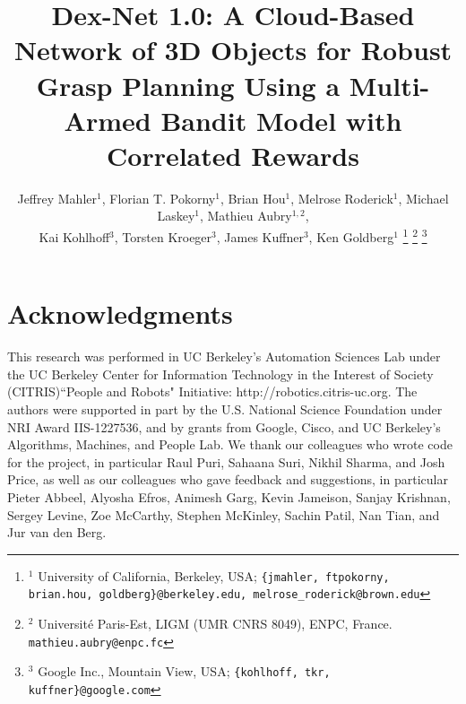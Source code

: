 \documentclass[letterpaper, 10 pt, conference]{ieeeconf}  %
\begin{document}
\title{\LARGE \bf Dex-Net 1.0: A Cloud-Based Network of 3D Objects for Robust Grasp Planning Using a Multi-Armed Bandit Model with Correlated Rewards
	\vspace{-2ex}
	}
\author{Jeffrey Mahler$^1$, Florian T. Pokorny$^1$, Brian Hou$^1$, Melrose Roderick$^1$, Michael Laskey$^1$, Mathieu Aubry$^{1,2}$, \\
Kai Kohlhoff$^3$, Torsten Kroeger$^3$, James Kuffner$^3$, Ken Goldberg$^{1}$
\thanks{{\small $^1$ University of California, Berkeley, USA; {\tt\small \{jmahler, ftpokorny, brian.hou, goldberg\}@berkeley.edu, melrose\_roderick@brown.edu}}}%
\thanks{{\small $^2$ Universit\'e Paris-Est, LIGM (UMR CNRS 8049), ENPC, France. {\tt\small mathieu.aubry@enpc.fc}}}%
\thanks{{\small $^3$ Google Inc., Mountain View, USA; {\tt\small \{kohlhoff, tkr, kuffner\}@google.com}} }
}
\maketitle


%


%


%




%

\section{Acknowledgments}
{\small
This research was performed in UC Berkeley's Automation Sciences Lab under the UC Berkeley Center for Information Technology in the Interest of Society (CITRIS)``People and Robots" Initiative: http://robotics.citris-uc.org.
The authors were supported in part by the U.S. National Science Foundation under NRI Award IIS-1227536, and by grants from Google, Cisco, and UC Berkeley's Algorithms, Machines, and People Lab.
We thank our colleagues who wrote code for the project, in particular Raul Puri, Sahaana Suri, Nikhil Sharma, and Josh Price, as well as our colleagues who gave feedback and suggestions, in particular Pieter Abbeel, Alyosha Efros, Animesh Garg, Kevin Jameison, Sanjay Krishnan, Sergey Levine, Zoe McCarthy, Stephen McKinley, Sachin Patil, Nan Tian, and Jur van den Berg.
}



\end{document}
